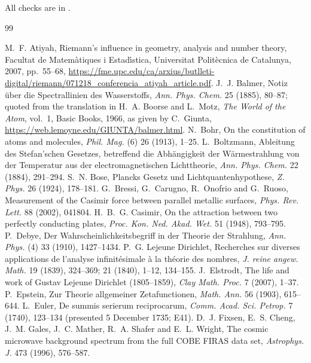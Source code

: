 \documentclass[11pt]{article}
\begin{document}
\begin{sloppypar}
\noindent All checks are in .
\end{sloppypar}

\begin{thebibliography}{99}
\begin{sloppypar}
 M.~F. Atiyah, Riemann's influence in geometry, analysis and number theory, Facultat de Matem\`atiques i Estad\'{\i}stica, Universitat Polit\`ecnica de Catalunya, 2007, pp.~55--68, \url{https://fme.upc.edu/ca/arxius/butlleti-digital/riemann/071218_conferencia_atiyah_article.pdf}.
 J.~J. Balmer, Notiz \"uber die Spectrallinien des Wasserstoffs, \emph{Ann. Phys. Chem.} 25 (1885), 80--87; quoted from the translation in H.~A. Boorse and L.~Motz, \emph{The World of the Atom}, vol.~1, Basic Books, 1966, as given by C.~Giunta, \url{https://web.lemoyne.edu/GIUNTA/balmer.html}.
 N.~Bohr, On the constitution of atoms and molecules, \emph{Phil. Mag.} (6) 26 (1913), 1--25.
 L.~Boltzmann, Ableitung des Stefan'schen Gesetzes, betreffend die Abh\"angigkeit der W\"armestrahlung von der Temperatur aus der electromagnetischen Lichttheorie, \emph{Ann. Phys. Chem.} 22 (1884), 291--294.
 S.~N. Bose, Plancks Gesetz und Lichtquantenhypothese, \emph{Z. Phys.} 26 (1924), 178--181.
 G.~Bressi, G.~Carugno, R.~Onofrio and G.~Ruoso, Measurement of the Casimir force between parallel metallic surfaces, \emph{Phys. Rev. Lett.} 88 (2002), 041804.
 H.~B.~G. Casimir, On the attraction between two perfectly conducting plates, \emph{Proc. Kon. Ned. Akad. Wet.} 51 (1948), 793--795.
 P.~Debye, Der Wahrscheinlichkeitsbegriff in der Theorie der Strahlung, \emph{Ann. Phys.} (4) 33 (1910), 1427--1434.
 P.~G. Lejeune Dirichlet, Recherches sur diverses applications de l'analyse infinit\'esimale \`a la th\'eorie des nombres, \emph{J. reine angew. Math.} 19 (1839), 324--369; 21 (1840), 1--12, 134--155.
 J.~Elstrodt, The life and work of Gustav Lejeune Dirichlet (1805--1859), \emph{Clay Math. Proc.} 7 (2007), 1--37.
 P.~Epstein, Zur Theorie allgemeiner Zetafunctionen, \emph{Math. Ann.} 56 (1903), 615--644.
 L.~Euler, De summis serierum reciprocarum, \emph{Comm. Acad. Sci. Petrop.} 7 (1740), 123--134 (presented 5 December 1735; E41).
 D.~J. Fixsen, E.~S. Cheng, J.~M. Gales, J.~C. Mather, R.~A. Shafer and E.~L. Wright, The cosmic microwave background spectrum from the full COBE FIRAS data set, \emph{Astrophys. J.} 473 (1996), 576--587.

\end{sloppypar}
\end{thebibliography}
\end{document}

